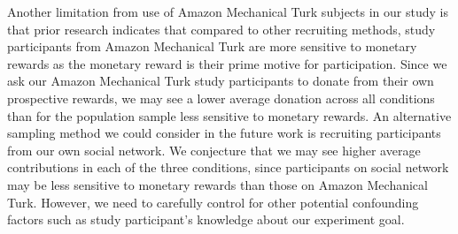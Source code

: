\begin{description}[leftmargin=\parindent,topsep=0pt,partopsep=3pt,parsep=0pt,itemsep=3pt, listparindent=\parindent]
Another limitation from use of Amazon Mechanical Turk subjects in our study is that prior research \cite{paolacci2010running,paolacci2014inside,kaufmann2011more} indicates that compared to other recruiting methods, study participants from Amazon Mechanical Turk are more sensitive to monetary rewards as the monetary reward is their prime motive for participation. 
Since we ask our Amazon Mechanical Turk study participants to donate from their own prospective rewards, we may see a lower average donation across all conditions than for the population sample less sensitive to monetary rewards. An alternative sampling method we could consider in the future work is recruiting participants from our own social network. We conjecture that we may see higher average contributions in each of the three conditions, since participants on social network may be less sensitive to monetary rewards than those on Amazon Mechanical Turk. However, we need to carefully control for other potential confounding factors such as study participant's knowledge about our experiment goal. 


\end{description}
